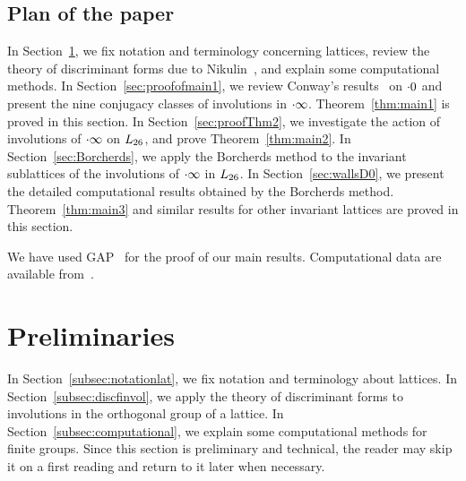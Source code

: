 \documentclass{amsart} %
\begin{document}
\subsection{Plan of the paper}\label{subsec:plan}
%
In Section~\ref{sec:prelim},
we fix notation and terminology concerning lattices, 
review the theory of discriminant forms
due to Nikulin~\cite{MR525944}, 
and explain some computational methods.
In Section~\ref{sec:proofofmain1},
we review Conway's results~\cite[Chapter 10]{theCSbook} on $\cdot 0$
and present the nine conjugacy classes of involutions in $\cdot \infty$.
Theorem~\ref{thm:main1} is proved in this section.
In Section~\ref{sec:proofThm2},
we investigate the action of involutions of $\cdot \infty$ on $L_{26}$,
and prove Theorem~\ref{thm:main2}.
In Section~\ref{sec:Borcherds},
we apply the Borcherds method to the invariant sublattices of the involutions 
of $\cdot \infty$ in $L_{26}$.
In Section~\ref{sec:wallsD0},
we present the detailed computational results obtained by
 the Borcherds method.
 Theorem~\ref{thm:main3} and similar results for other invariant lattices are proved in this section.
%
\par
We have used GAP~\cite{GAP4} 
for the proof of our main results.
Computational data are available from~\cite{affConwayCompdata}.
%
\section{Preliminaries}\label{sec:prelim}
%
In Section~\ref{subsec:notationlat}, 
we fix notation and terminology about lattices.
In Section~\ref{subsec:discfinvol},
we apply the theory of discriminant forms
to  involutions in the orthogonal group of a lattice.
In Section~\ref{subsec:computational},
we explain some computational methods 
for finite groups.
Since this section is preliminary and technical, the reader may skip it on a first reading and return to it later when necessary.
%
%
\end{document}
